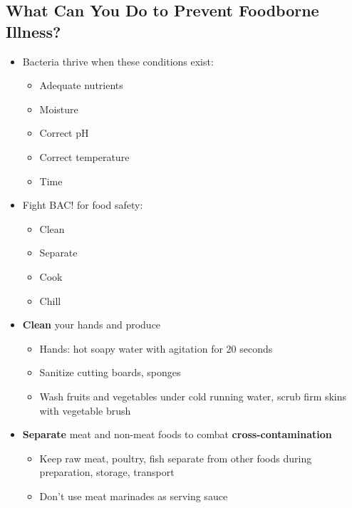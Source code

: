 \documentclass[12pt]{article}
\begin{document}
        \subsection{What Can You Do to Prevent Foodborne Illness?}
            \begin{itemize}
                \item Bacteria thrive when these conditions exist:
                    \begin{itemize}
                        \item Adequate nutrients
                        \item Moisture
                        \item Correct pH
                        \item Correct temperature
                        \item Time
                    \end{itemize}
                \item Fight BAC! for food safety:
                    \begin{itemize}
                        \item Clean
                        \item Separate
                        \item Cook
                        \item Chill
                    \end{itemize}
                \item \textbf{Clean} your hands and produce
                    \begin{itemize}
                        \item Hands: hot soapy water with agitation for 20 seconds
                        \item Sanitize cutting boards, sponges
                        \item Wash fruits and vegetables under cold running water, scrub firm skins with vegetable brush
                    \end{itemize}
                \item \textbf{Separate} meat and non-meat foods to combat \textbf{cross-contamination}
                    \begin{itemize}
                        \item Keep raw meat, poultry, fish separate from other foods during preparation, storage, transport
                        \item Don't use meat marinades as serving sauce

\end{itemize}
\end{itemize}
\end{document}
